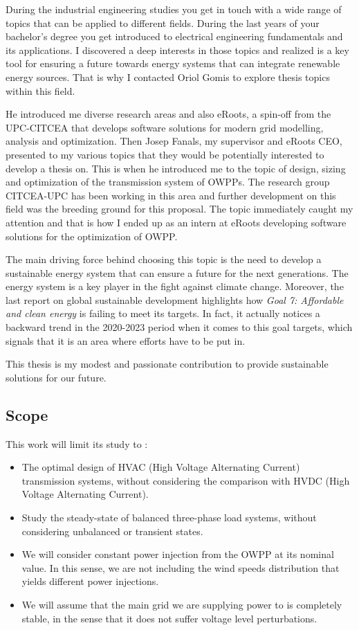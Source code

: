 \documentclass[a4paper,11pt, titlepage, twoside]{article}
\begin{document}
During the industrial engineering studies you get in touch with a wide range of topics that can be applied
to different fields. During the last years of your bachelor's degree you get introduced to electrical engineering fundamentals and its 
applications. I discovered a deep interests in those topics and realized is a key tool for ensuring a future towards
energy systems that can integrate renewable energy sources. That is why I 
contacted Oriol Gomis to explore thesis topics within this field.\par

He introduced me diverse research areas and also eRoots, a spin-off from the UPC-CITCEA
that develops software solutions for modern grid modelling, analysis and optimization. Then Josep Fanals, my supervisor
and eRoots CEO, presented to my various topics that they would be potentially interested to develop a thesis on. This is when 
he introduced me to the topic of design, sizing and optimization of the transmission system of OWPPs. The research 
group CITCEA-UPC has been working in this area \cite{paperbase} and further development on this field was the breeding ground for this proposal.
The topic immediately caught my attention and that is how I ended up as an intern at eRoots developing software solutions for the optimization of OWPP.


The main driving force behind choosing this topic is the need to develop a sustainable energy system that can
ensure a future for the next generations. The energy system is a key player in the fight against climate change. Moreover, the last
report on global sustainable development \cite{SustGoal7} highlights how \textit{Goal 7: Affordable and clean energy} is failing to meet its targets.
In fact, it actually notices a backward trend in the 2020-2023 period when it comes to this goal targets, which signals that it is an area where efforts
have to be put in. \par

This thesis is my modest and passionate contribution to provide sustainable solutions for our future.

\subsection{Scope}

This work will limit its study to :
\begin{itemize}
    \item The optimal design of HVAC (High Voltage Alternating Current) transmission systems, without considering the comparison with HVDC (High Voltage Alternating Current).
    \item Study the steady-state of balanced three-phase load systems, without considering unbalanced or transient states.
    \item We will consider constant power injection from the OWPP at its nominal value. In this sense, we are not including the wind speeds distribution that yields different 
    power injections.
    \item We will assume that the main grid we are supplying power to is completely stable, in the sense that it does not suffer voltage level perturbations.
\end{itemize}
\end{document}
